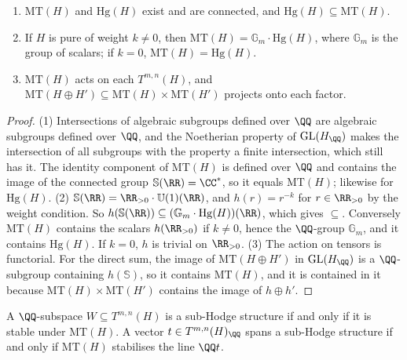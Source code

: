 \begin{proposition}\label{hodge-structures:proposition-basic}
\begin{enumerate}
\item $\mathrm{MT}(H)$ and $\mathrm{Hg}(H)$ exist and are connected, and $\mathrm{Hg}(H) \subseteq \mathrm{MT}(H)$.
\item If $H$ is pure of weight $k \neq 0$, then $\mathrm{MT}(H) = \mathbb{G}_m \cdot \mathrm{Hg}(H)$, where $\mathbb{G}_m$ is the group of scalars; if $k = 0$, $\mathrm{MT}(H) = \mathrm{Hg}(H)$.
\item $\mathrm{MT}(H)$ acts on each $T^{m,n}(H)$, and $\mathrm{MT}(H \oplus H') \subseteq \mathrm{MT}(H) \times \mathrm{MT}(H')$ projects onto each factor.
\end{enumerate}
\end{proposition}

\begin{proof}
(1) Intersections of algebraic subgroups defined over $\QQ$ are algebraic subgroups defined over $\QQ$, and the Noetherian property of $\mathrm{GL}(H_\QQ)$ makes the intersection of all
subgroups with the property a finite intersection, which still has it. The identity component of $\mathrm{MT}(H)$ is defined over $\QQ$ and contains the image of the connected group
$\mathbb{S}(\RR) = \CC^*$, so it equals $\mathrm{MT}(H)$; likewise for $\mathrm{Hg}(H)$. (2) $\mathbb{S}(\RR) = \RR_{>0} \cdot \mathbb{U}(1)(\RR)$, and $h(r) = r^{-k}$ for $r \in \RR_{>0}$ by the
weight condition. So $h(\mathbb{S}(\RR)) \subseteq (\mathbb{G}_m \cdot \mathrm{Hg}(H))(\RR)$, which gives $\subseteq$. Conversely $\mathrm{MT}(H)$ contains the scalars $h(\RR_{>0})$ if $k \neq 0$,
hence the $\QQ$-group $\mathbb{G}_m$, and it contains $\mathrm{Hg}(H)$. If $k = 0$, $h$ is trivial on $\RR_{>0}$. (3) The action on tensors is functorial. For the direct sum, the image of
$\mathrm{MT}(H \oplus H')$ in $\mathrm{GL}(H_\QQ)$ is a $\QQ$-subgroup containing $h(\mathbb{S})$, so it contains $\mathrm{MT}(H)$, and it is contained in it because
$\mathrm{MT}(H) \times \mathrm{MT}(H')$ contains the image of $h \oplus h'$.
\end{proof}

\begin{theorem}\label{hodge-structures:theorem-sub-hodge}
A $\QQ$-subspace $W \subseteq T^{m,n}(H)$ is a sub-Hodge structure if and only if it is stable under $\mathrm{MT}(H)$. A vector $t \in T^{m,n}(H)_\QQ$ spans a sub-Hodge structure if and only if
$\mathrm{MT}(H)$ stabilises the line $\QQ t$.
\end{theorem}


